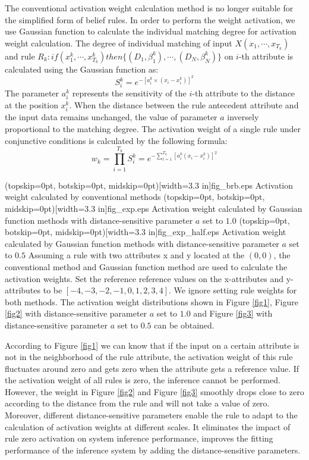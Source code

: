 \documentclass{ieeeaccess}
\begin{document}
The conventional activation weight calculation method is no longer suitable for the simplified form of belief rules.
In order to perform the weight activation, we use Gaussian function to calculate the individual matching degree for activation weight calculation.
The degree of individual matching of input $X(x_1,\cdots,x_{T_k})$ and rule $R_k:if(x_1^k , \cdots , x_{T_k}^k)then\{(D_1,\beta_1^k),\cdots,(D_N,\beta_N^k)\}$ on $i$-th attribute is calculated using the Gaussian function as:
\begin{equation}
    S_i^k=e^{-[a_i^k\times(x_i-x_i^k)]^2}
\end{equation}
The parameter $a_i^k$ represents the sensitivity of the $i$-th attribute to the distance at the position $x_i^k$. When the distance between the rule antecedent attribute and the input data remains unchanged,
the value of parameter $a$ inversely proportional to the matching degree.
The activation weight of a single rule under conjunctive conditions is calculated by the following formula:
\begin{equation}
    w_k=\prod_{i=1}^{T_k}S_i^k=e^{-\sum_{i=1}^{T_k}[a_i^k(x_i-x_i^k)]^2}
\end{equation}


\Figure[!t](topskip=0pt, botskip=0pt, midskip=0pt)[width=3.3 in]{fig_brb.eps}
{Activation weight calculated by conventional methods\label{fig1}}
\Figure[!t](topskip=0pt, botskip=0pt, midskip=0pt)[width=3.3 in]{fig_exp.eps}
{Activation weight calculated by Gaussian function methods with distance-sensitive parameter $a$ set to $1.0$\label{fig2}}
\Figure[!t](topskip=0pt, botskip=0pt, midskip=0pt)[width=3.3 in]{fig_exp_half.eps}
{Activation weight calculated by Gaussian function methods with distance-sensitive parameter $a$ set to $0.5$\label{fig3}}
Assuming a rule with two attributes x and y located at the $(0,0)$, the conventional method and Gaussian function method are used to calculate the activation weights.
Set the reference reference values on the x-attributes and y-attributes to be $[-4,-3,-2,-1,0,1,2,3,4]$.
We ignore setting rule weights for both methods.
The activation weight distributions shown in Figure \ref{fig1},
Figure \ref{fig2} with distance-sensitive parameter $a$ set to $1.0$ and
Figure \ref{fig3} with distance-sensitive parameter $a$ set to $0.5$ can be obtained.

According to Figure \ref{fig1} we can know that if the input on a certain attribute is not in the neighborhood of the rule attribute,
the activation weight of this rule fluctuates around zero and gets zero when the attribute gets a reference value.
If the activation weight of all rules is zero, the inference cannot be performed.
However, the weight in Figure \ref{fig2} and Figure \ref{fig3} smoothly drops close to zero according to the distance from the rule and will not take a value of zero.
Moreover, different distance-sensitive parameters enable the rule to adapt to the calculation of activation weights at different scales.
It eliminates the impact of rule zero activation on system inference performance,
improves the fitting performance of the inference system by adding the distance-sensitive parameters.
\end{document}
